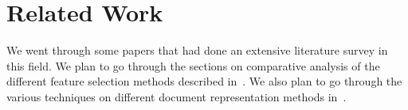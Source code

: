 \chapter{Related Work}

We went through some papers that had done an extensive literature survey in
this field. We plan to go through the sections on comparative analysis of the
different feature selection methods described in~\cite{perira:2014:jcdl}.
We also plan to go
through the various techniques on different document representation methods
in~\cite{perira:2014:jcdl}.


